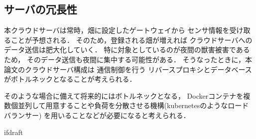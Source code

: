\documentclass[12pt]{honka_v1}
\begin{document}
\subsection{サーバの冗長性}
本クラウドサーバは常時，畑に設定したゲートウェイから
センサ情報を受け取ることが予想される．
そのため，登録される畑が増えれば
クラウドサーバへのデータ送信は肥大化していく．
特に対象としているのが夜間の獣害被害であるため，
そのデータ送信も夜間に集中する可能性がある．
そうなったときに，本論文のクラウドサーバ構成は
通信制御を行う
リバースプロキシとデータベースがボトルネックとなることが考えられる．

そのような場合に備えて将来的にはボトルネックとなる，
Dockerコンテナを複数個並列して用意することや負荷を分散させる機構(kubernetesのようなロードバランサー)
を用いることなどが必要になると考えられる．


















\expandafter\ifx\csname ifdraft\endcsname\relax
    \newcommand{\ifdraft}{false}
    
    
\end{document}
